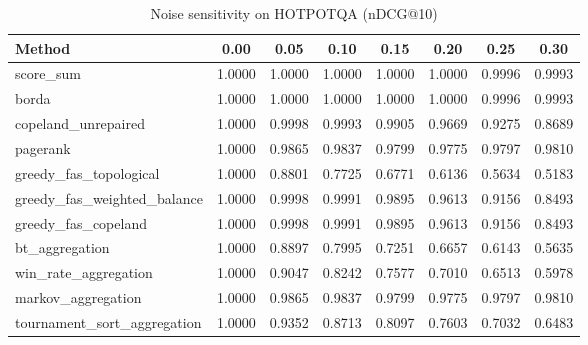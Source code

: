 \begin{table}[ht]
\centering
\caption{Noise sensitivity on HOTPOTQA (nDCG@10)}
\label{tab:noise_sensitivity_hotpotqa}
\begin{tabular}{lccccccc}
\toprule
Method & 0.00 & 0.05 & 0.10 & 0.15 & 0.20 & 0.25 & 0.30 \\
\midrule
score\_sum & 1.0000 & 1.0000 & 1.0000 & 1.0000 & 1.0000 & 0.9996 & 0.9993 \\
borda & 1.0000 & 1.0000 & 1.0000 & 1.0000 & 1.0000 & 0.9996 & 0.9993 \\
copeland\_unrepaired & 1.0000 & 0.9998 & 0.9993 & 0.9905 & 0.9669 & 0.9275 & 0.8689 \\
pagerank & 1.0000 & 0.9865 & 0.9837 & 0.9799 & 0.9775 & 0.9797 & 0.9810 \\
greedy\_fas\_topological & 1.0000 & 0.8801 & 0.7725 & 0.6771 & 0.6136 & 0.5634 & 0.5183 \\
greedy\_fas\_weighted\_balance & 1.0000 & 0.9998 & 0.9991 & 0.9895 & 0.9613 & 0.9156 & 0.8493 \\
greedy\_fas\_copeland & 1.0000 & 0.9998 & 0.9991 & 0.9895 & 0.9613 & 0.9156 & 0.8493 \\
bt\_aggregation & 1.0000 & 0.8897 & 0.7995 & 0.7251 & 0.6657 & 0.6143 & 0.5635 \\
win\_rate\_aggregation & 1.0000 & 0.9047 & 0.8242 & 0.7577 & 0.7010 & 0.6513 & 0.5978 \\
markov\_aggregation & 1.0000 & 0.9865 & 0.9837 & 0.9799 & 0.9775 & 0.9797 & 0.9810 \\
tournament\_sort\_aggregation & 1.0000 & 0.9352 & 0.8713 & 0.8097 & 0.7603 & 0.7032 & 0.6483 \\
\bottomrule
\end{tabular}
\end{table}
